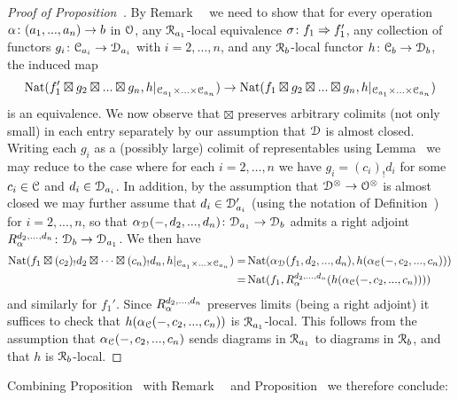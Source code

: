 \begin{proof}[Proof of Proposition~]
By Remark~~ we need to show that for every operation $\alpha\colon (a_1,...,a_n) \to b$ in $\mathcal{O}$, any $\mathcal{R}_{a_1}$-local equivalence $\sigma\colon f_1 \Rightarrow f_1'$, any collection of functors $g_i\colon \mathcal C_{a_i} \to \mathcal{D}_{a_i}$ with $i=2,...,n$, and any $\mathcal{R}_b$-local functor $h\colon \mathcal C_b \to \mathcal{D}_{b}$, the induced map
\[
\operatorname{Nat}(f_1' \boxtimes g_2 \boxtimes ... \boxtimes g_n,h|_{\mathcal C_{a_1} \times ... \times \mathcal C_{a_n}}) \to \operatorname{Nat}(f_1 \boxtimes g_2 \boxtimes ... \boxtimes g_n,h|_{\mathcal C_{a_1} \times ... \times \mathcal C_{a_n}})
\]
is an equivalence. We now observe that $\boxtimes$ preserves arbitrary colimits (not only small) in each entry separately by our assumption that $\mathcal{D}$ is almost closed. %
Writing each $g_i$ as a (possibly large) colimit of representables using Lemma~ we may reduce to the case where for each $i=2,\dots,n$ we have $g_i = (c_i)_!d_i$ for some $c_i \in \mathcal C$ and $d_i \in \mathcal{D}_{a_i}$. In addition, by the assumption that $\mathcal{D}^{\otimes} \to \mathcal{O}^{\otimes}$ is almost closed
we may further assume that $d_i \in \mathcal{D}'_{a_i}$ (using the notation of Definition~) for $i=2,...,n$, so that $\alpha_{\mathcal{D}}(-,d_2,...,d_n)\colon \mathcal{D}_{a_1} \to \mathcal{D}_b$ admits a right adjoint $R^{d_2,...,d_n}_{\alpha}\colon \mathcal{D}_b \to \mathcal{D}_{a_1}$. We then have
\begin{align*}
\operatorname{Nat}(f_1 \boxtimes (c_2)_!d_2 \boxtimes \dots \boxtimes (c_n)_!d_n, h|_{\mathcal C_{a_1}\times ... \times \mathcal C_{a_n}}) =& 
\operatorname{Nat}(\alpha_{\mathcal{D}}(f_1,d_2,...,d_n), h(\alpha_{\mathcal C}(-,c_2,...,c_n)))\\
=&\operatorname{Nat}(f_1,R^{d_2,...,d_n}_{\alpha}(h(\alpha_{\mathcal C}(-,c_2,...,c_n))))
\end{align*}
and similarly for $f_1'$.
Since $R^{d_2,...,d_n}_{\alpha}$ preserves limits (being a right adjoint) it suffices to check that $h(\alpha_{\mathcal C}(-,c_2,...,c_n))$
is $\mathcal{R}_{a_1}$-local. This follows from the assumption that $\alpha_{\mathcal C}(-,c_2,...,c_n)$ sends diagrams in $\mathcal{R}_{a_1}$ to diagrams in $\mathcal{R}_{b}$, and that $h$ is $\mathcal{R}_b$-local.
\end{proof}




Combining Proposition~ with Remark~~
and Proposition~ %
we therefore conclude:


